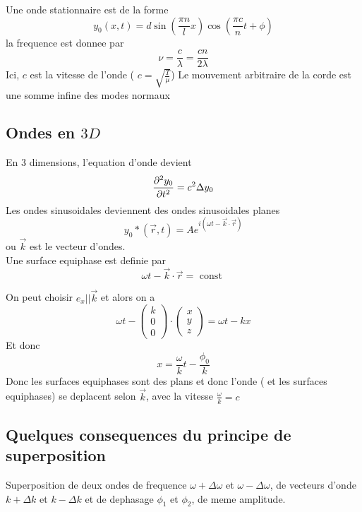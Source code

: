 \documentclass[../main.tex]{subfiles}
\begin{document}
Une onde stationnaire est de la forme
\[ 
	y_0( x,t) = d \sin( \frac{\pi n}{l}x) \cos( \frac{\pi c}{n} t + \phi) 
\]
la frequence est donnee par 
\[ 
\nu = \frac{c}{\lambda}= \frac{cn}{ 2\lambda}
\]
Ici, $c$ est la vitesse de l'onde ( $c= \sqrt{ \frac{T}{\mu} }$) 
Le mouvement arbitraire de la corde est une somme infine des modes normaux
\subsection{Ondes en $3D$}
En 3 dimensions, l'equation d'onde devient
\[ 
\frac{\partial ^{2} y_0}{\partial t^{2}} = c^{2} \Delta y_0
\]
Les ondes sinusoidales deviennent des ondes sinusoidales planes
\[ 
	y_0*( \vec{r},t)  = A e^{i( \omega t - \vec{k} \cdot \vec{r}) } 
\]
ou $\vec{k}$ est le vecteur d'ondes.\\
Une surface equiphase est definie par
\[ 
\omega t - \vec{k} \cdot \vec{r} = \text{ const } 
\]

On peut choisir $e_x || \vec{k}$ et alors
on a 
\[ 
\omega t - 
\begin{pmatrix}
k \\ 0 \\0
\end{pmatrix}
\cdot
\begin{pmatrix}
x\\y\\z
\end{pmatrix}
= \omega t - kx 
\]
Et donc
\[ 
x = \frac{\omega }{k} t - \frac{\phi_0}{k}
\]
Donc les surfaces equiphases sont des plans et donc l'onde ( et les surfaces equiphases)  se deplacent selon $\vec{k}$, avec la vitesse $\frac{\omega}{k}=c$
\subsection{Quelques consequences du principe de superposition}
Superposition de deux ondes de frequence $\omega + \Delta \omega$ et $\omega - \Delta \omega$, de vecteurs d'onde $k+ \Delta k$ et $k - \Delta k$ et de dephasage $\phi_1$ et $\phi_2$, de meme amplitude.\\
\end{document}
